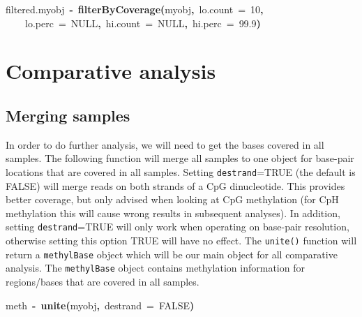 \documentclass{article}
\makeatletter
\newcommand{\hlnumber}[1]{\textcolor[rgb]{0,0,0}{#1}}%
\newcommand{\hlfunctioncall}[1]{\textcolor[rgb]{.5,0,.33}{\textbf{#1}}}%
\newcommand{\hlkeyword}[1]{\textbf{#1}}%
\newcommand{\hlargument}[1]{\textcolor[rgb]{.69,.25,.02}{#1}}%
\newcommand{\hlassignement}[1]{\textbf{#1}}%
\newcommand{\hlsymbol}[1]{#1}%
\newcommand{\hlstd}[1]{\textcolor[rgb]{0,0,0}{#1}}%
\newenvironment{kframe}{%
 \def\FrameCommand##1{\hskip\@totalleftmargin \hskip-\fboxsep
 \colorbox{shadecolor}{##1}\hskip-\fboxsep
     \hskip-\linewidth \hskip-\@totalleftmargin \hskip\columnwidth}%
 \MakeFramed {\advance\hsize-\width
   \@totalleftmargin\z@ \linewidth\hsize
   \@setminipage}}%
 {\par\unskip\endMakeFramed}
\newenvironment{knitrout}{}{} %
\makeatother
\begin{document}
\begin{knitrout}
\color{fgcolor}\begin{kframe}
\begin{flushleft}
\ttfamily\noindent
\hlsymbol{filtered.myobj}{\ }\hlassignement{\usebox{\hlnormalsizeboxlessthan}-}{\ }\hlfunctioncall{filterByCoverage}\hlkeyword{(}\hlsymbol{myobj}\hlkeyword{,}{\ }\hlargument{lo.count}{\ }\hlargument{=}{\ }\hlnumber{10}\hlkeyword{,}\hspace*{\fill}\\
\hlstd{}{\ }{\ }{\ }{\ }\hlargument{lo.perc}{\ }\hlargument{=}{\ }NULL\hlkeyword{,}{\ }\hlargument{hi.count}{\ }\hlargument{=}{\ }NULL\hlkeyword{,}{\ }\hlargument{hi.perc}{\ }\hlargument{=}{\ }\hlnumber{99.9}\hlkeyword{)}\mbox{}
\normalfont
\end{flushleft}
\end{kframe}
\end{knitrout}



\section{Comparative analysis}
\subsection{Merging samples}

In order to do further analysis, we will need to get the bases covered in all samples. The following function will merge all samples to one object for base-pair locations that are covered in all samples. Setting \texttt{destrand}=TRUE (the default is FALSE) will merge reads on both strands of a CpG dinucleotide. This provides better coverage, but only advised when looking at CpG methylation (for CpH methylation this will cause wrong results in subsequent analyses). In addition, setting \texttt{destrand}=TRUE will only work when operating on base-pair resolution, otherwise setting this option TRUE will have no effect. The \texttt{unite()} function will return a \texttt{methylBase} object which will be our main object for all comparative analysis. The \texttt{methylBase} object contains methylation information for regions/bases that are covered in all samples.
\begin{knitrout}
\color{fgcolor}\begin{kframe}
\begin{flushleft}
\ttfamily\noindent
\hlsymbol{meth}{\ }\hlassignement{\usebox{\hlnormalsizeboxlessthan}-}{\ }\hlfunctioncall{unite}\hlkeyword{(}\hlsymbol{myobj}\hlkeyword{,}{\ }\hlargument{destrand}{\ }\hlargument{=}{\ }\hlnumber{FALSE}\hlkeyword{)}\mbox{}
\normalfont
\end{flushleft}
\end{kframe}
\end{knitrout}
\end{document}
